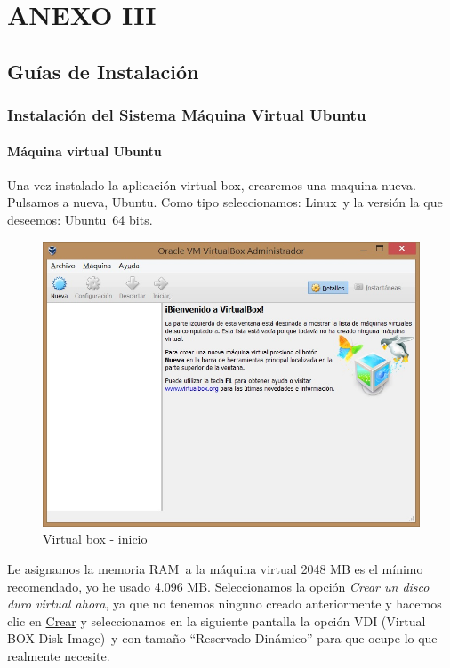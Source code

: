 \chapter{ANEXO III}

\section{Guías de Instalación}

\subsection{Instalación del Sistema Máquina Virtual Ubuntu}

\subsubsection{Máquina virtual Ubuntu}

Una vez instalado la aplicación virtual box, crearemos una maquina nueva. Pulsamos a nueva, Ubuntu. Como tipo seleccionamos: Linux y la versión la que deseemos: Ubuntu 64 bits. 

\begin{figure}[H]
	\centering
	\includegraphics[width=0.7\linewidth]{figuras/vm-1}
	\caption{Virtual box - inicio}
	\label{fig:vm1}
\end{figure}

Le asignamos la memoria RAM a la máquina virtual 2048 MB es el mínimo recomendado, yo he usado 4.096 MB. Seleccionamos la opción \textit{Crear un disco duro virtual ahora}, ya que no tenemos ninguno creado anteriormente y hacemos clic en \underline{Crear} y seleccionamos en la siguiente pantalla la opción VDI (Virtual BOX Disk Image) y con tamaño “Reservado Dinámico” para que ocupe lo que realmente necesite.


